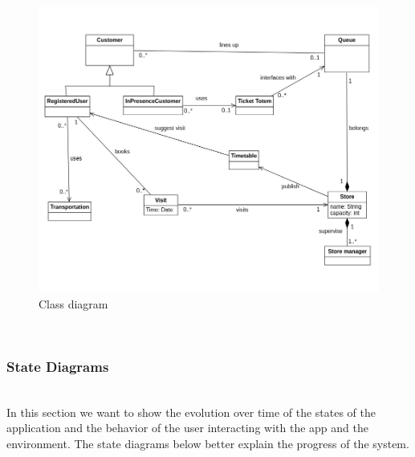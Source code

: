 \documentclass[]{article}
\begin{document}
		\begin{figure}[htp]
			\centering
			\includegraphics[scale=0.5]{UML_class_diagram.png}
			\caption{Class diagram}
			\label{fig:class_diagram}
		\end{figure}
		
	\textbf{}\\
		\subsubsection{State Diagrams}
		
		\textbf{}\\ \newline
		In this section we want to show the evolution over time of the states of the application and the behavior of the user interacting with the app and the environment. 
The state diagrams below better explain the progress of the system.\\
		
		\textbf{}\\ \newline
		
\end{document}
